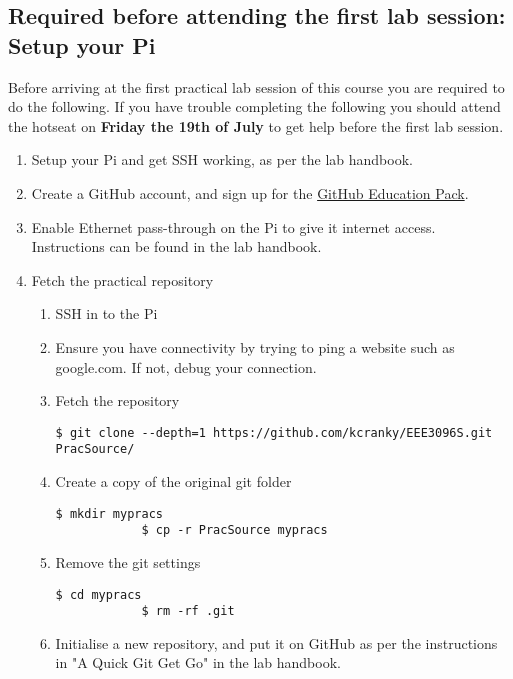 \subsection{Required before attending the first lab session: Setup your Pi }
Before arriving at the first practical lab session of this course you are required to do the following. If you have trouble completing the following you should attend the hotseat on \textbf{Friday the 19th of July} to get help before the first lab session.
\begin{enumerate}
    \item Setup your Pi and get SSH working, as per the lab handbook.
    \item Create a GitHub account, and sign up for the \href{https://education.github.com/pack}{GitHub Education Pack}.
    \item Enable Ethernet pass-through on the Pi to give it internet access. Instructions can be found in the lab handbook.
    \item Fetch the practical repository
    \begin{enumerate}
        \item SSH in to the Pi
        \item Ensure you have connectivity by trying to ping a website such as google.com. If not, debug your connection.
        \item Fetch the repository
            \begin{lstlisting}[gobble=12]
            $ git clone --depth=1 https://github.com/kcranky/EEE3096S.git PracSource/
            \end{lstlisting}
        \item Create a copy of the original git folder
            \begin{lstlisting}[gobble=12]
            $ mkdir mypracs
            $ cp -r PracSource mypracs
            \end{lstlisting}
        \item Remove the git settings
            \begin{lstlisting}[gobble=12]
            $ cd mypracs
            $ rm -rf .git
            \end{lstlisting}
        \item Initialise a new repository, and put it on GitHub as per the instructions in "A Quick Git Get Go" in the lab handbook.
    \end{enumerate}
\end{enumerate}

